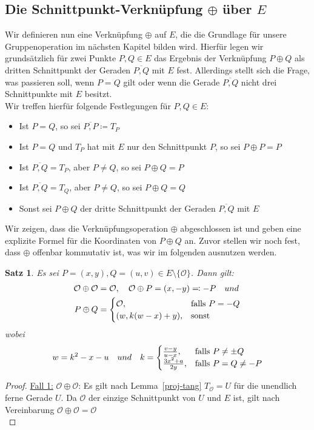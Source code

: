 \documentclass[hidelinks]{article}
\theoremstyle{plain}
\newtheorem{thm}{Satz}[section]
\theoremstyle{definition}
\theoremstyle{rem}
\newcommand{\patinf}{\mathcal{O}}
\begin{document}
\begin{sloppypar}
\subsection{Die Schnittpunkt-Verknüpfung $\oplus $ über $E$}\label{schnittpunkt-verkn}
Wir definieren nun eine Verknüpfung $\oplus$ auf $E$, die die Grundlage für unsere Gruppenoperation im nächsten Kapitel bilden wird. 
Hierfür legen wir grundsätzlich für zwei Punkte $P,Q\in E$ das Ergebnis der Verknüpfung $P\oplus Q$ als dritten Schnittpunkt der Geraden $\overline{P,Q}$ mit $E$ fest.
Allerdings stellt sich die Frage, was passieren soll, wenn $P=Q$ gilt oder wenn die Gerade $\overline{P,Q}$ nicht drei Schnittpunkte mit $E$ besitzt.\\
Wir treffen hierfür folgende Festlegungen für $P,Q\in E$:
\begin{itemize}
    \item Ist $P=Q$, so sei $\overline{P,P}\coloneqq T_P$
    \item Ist $P=Q$ und $T_P$ hat mit $E$ nur den Schnittpunkt $P$, so sei $P\oplus P=P$
    \item Ist $\overline{P,Q}=T_P$, aber $P\ne Q$, so sei $P\oplus Q=P$
    \item Ist $\overline{P,Q}=T_Q$, aber $P\ne Q$, so sei $P\oplus Q=Q$
    \item Sonst sei $P\oplus Q$ der dritte Schnittpunkt der Geraden $\overline{P,Q}$ mit $E$
\end{itemize}
Wir zeigen, dass die Verknüpfungsoperation $\oplus$ abgeschlossen ist und geben eine explizite Formel für die Koordinaten von $P\oplus Q$ an.
Zuvor stellen wir noch fest, dass $\oplus$ offenbar kommutativ ist, was wir im folgenden ausnutzen werden.
\begin{thm} \label{oplus-op}
    Es sei $P=(x,y),Q=(u,v)\in E\setminus\{\patinf\}$. Dann gilt:
    \begin{align*}
        \patinf\oplus\patinf&=\patinf,\quad \patinf\oplus P=(x,-y)\eqqcolon-P\quad\normalfont{und}\\
        P\oplus Q&=
        \begin{cases}
            \patinf, & \text{falls }P=-Q\\
            (w,k(w-x)+y), & \text{sonst}
        \end{cases}
    \end{align*}
    wobei
    \begin{align*}
        w=k^2-x-u\quad\normalfont{und}\quad k=
        \begin{cases}
            \frac{v-y}{u-x}, & \text{falls }P\ne\pm Q\\
            \frac{3x^2+a}{2y}, & \text{falls }P=Q\ne -P
        \end{cases}
    \end{align*}
\end{thm}
\begin{proof}
    \underline{Fall 1:} $\patinf\oplus\patinf$: Es gilt nach Lemma~\ref{proj-tang} $T_{\patinf}=U$ für die unendlich ferne Gerade $U$. Da $\patinf$ der einzige Schnittpunkt von $U$ und $E$ ist, gilt nach Vereinbarung $\patinf\oplus\patinf=\patinf$\\


\end{proof}
\end{sloppypar}
\end{document}
